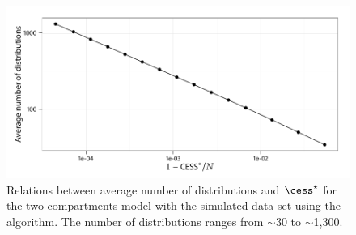 \begin{figure}[t]
  \linespread{1.1}\selectfont
  \includegraphics[width=\linewidth]{fig_src/CESS_Iter_Mean}
  \caption[Relations between average number of distributions and
  \protect\cess]
  {Relations between average number of distributions and $\cess^\star$ for the
    two-compartments \pet model with the simulated data set using the \smc[2]
    algorithm. The number of distributions ranges from $\sim$30 to
    $\sim$1,300.}
  \label{fig:cess iter mean}
\end{figure}
